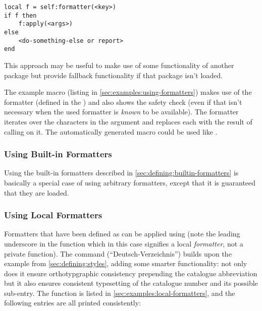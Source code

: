 \documentclass[12pt]{scrartcl}
\begin{document}
\begin{verbatim}
local f = self:formatter(<key>)
if f then
	f:apply(<args>)
else
	<do-something-else or report>
end
\end{verbatim}

\noindent This approach may be useful to make use of some functionality of
another package but provide fallback functionality if that package isn't loaded.

The example macro  (listing in
\vref{sec:examples:using-formatters}) makes use of the formatter 
(defined in the  ) and also shows the
safety check (even if that isn't necessary when the used formatter is
\emph{known} to be available). The formatter iterates over the characters in the
 argument and replaces each with the result of calling
 on it.  The automatically generated macro could be used like
.


\subsubsection{Using Built-in Formatters}
\label{sec:advanced:modular:builtin-formatters}

Using the built-in formatters described in \vref{sec:defining:builtin-formatters} is basically a special case of using arbitrary formatters, except that it is guaranteed that they are loaded.


\subsubsection{Using Local Formatters}
\label{sec:advanced:modular:local-formatters}

Formatters that have been defined as 
can be applied using  (note the leading
underscore in the function which in this case signifies a local
\emph{formatter}, not a private function). The command 
(“Deutsch-Verzeichnis”) builds upon the  example from
\vref{sec:defining:styles}, adding some smarter functionality: not only does it
ensure orthotypgraphic consistency prepending the catalogue abbreviation but it
also ensures consistent typesetting of the catalogue number and its possible
sub-entry.  The function is listed in \vref{sec:examples:local-formatters}, and
the following entries are all printed consistently:
\end{document}
